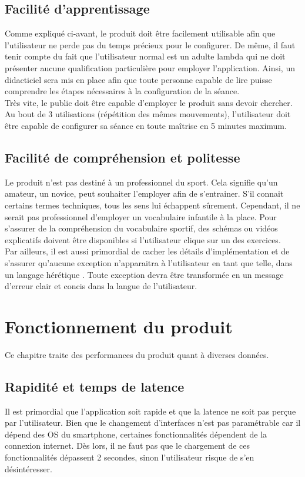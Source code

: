 \subsection*{Facilité d'apprentissage}
Comme expliqué ci-avant, le produit doit être facilement utilisable afin que l'utilisateur ne perde pas du temps précieux pour le configurer. De même, il faut tenir compte du fait que l'utilisateur normal est un adulte lambda qui ne doit présenter aucune qualification particulière pour employer l'application. Ainsi, un didacticiel sera mis en place afin que toute personne capable de lire puisse comprendre les étapes nécessaires à la configuration de la séance.\\

Très vite, le public doit être capable d'employer le produit sans devoir chercher. Au bout de 3 utilisations (répétition des mêmes mouvements), l'utilisateur doit être capable de configurer sa séance en toute maîtrise en 5 minutes maximum.

\subsection*{Facilité de compréhension et politesse}
Le produit n'est pas destiné à un professionnel du sport. Cela signifie qu'un amateur, un novice, peut souhaiter l'employer afin de s'entrainer. S'il connait certains termes techniques, tous les sens lui échappent sûrement. Cependant, il ne serait pas professionnel d'employer un vocabulaire infantile à la place. Pour s'assurer de la compréhension du vocabulaire sportif, des schémas ou vidéos explicatifs doivent être disponibles si l'utilisateur clique sur un des exercices.\\

Par ailleurs, il est aussi primordial de cacher les détails d'implémentation et de s'assurer qu'aucune exception n'apparaitra à l'utilisateur en tant que telle, dans un langage \og hérétique \fg{}. Toute exception devra être transformée en un message d'erreur clair et concis dans la langue de l'utilisateur.

\section{Fonctionnement du produit}
Ce chapitre traite des performances du produit quant à diverses données.

\subsection*{Rapidité et temps de latence}
Il est primordial que l'application soit rapide et que la latence ne soit pas perçue par l'utilisateur. Bien que le changement d'interfaces n'est pas paramétrable car il dépend des OS du smartphone, certaines fonctionnalités dépendent de la connexion internet. Dès lors, il ne faut pas que le chargement de ces fonctionnalités dépassent 2 secondes, sinon l'utilisateur risque de s'en désintéresser.

